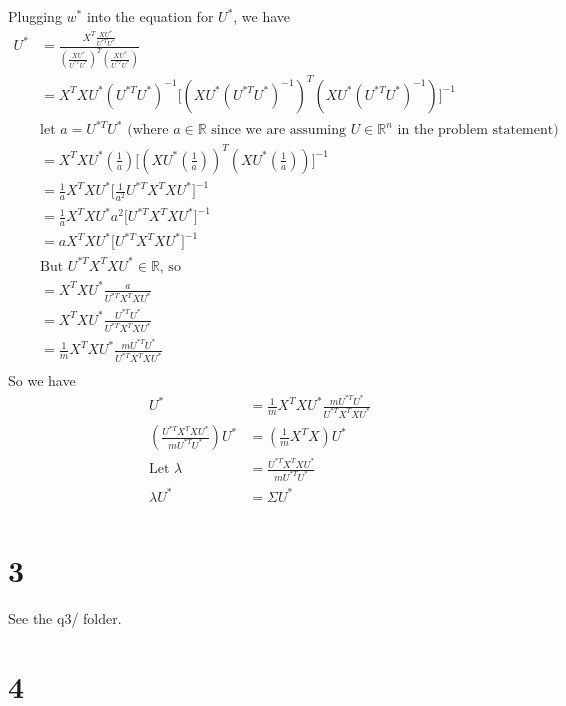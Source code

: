 \documentclass[11pt]{article}
\begin{document}
Plugging $w^*$ into the equation for $U^*$, we have
\begin{align*}
    U^* &= \frac{X^T \frac{XU^*}{U^{*T} U^*}}{(\frac{XU^*}{U^{*T}U^*})^T (\frac{XU^*}{U^{*T}U^*})} \\
        &= X^T X U^* (U^{*T} U^*)^{-1} \big[ (X U^* (U^{*T} U^*)^{-1})^T (X U^* (U^{*T} U^*)^{-1}) \big]^{-1} \\
        &\text{let $a = U^{*T} U^*$ (where $a \in \mathbb{R}$ since we are assuming $U \in \mathbb{R}^n$ in the problem statement)} \\
        &= X^T X U^* (\frac{1}{a}) \big[ (X U^* (\frac{1}{a}))^T (X U^* (\frac{1}{a})) \big]^{-1} \\
        &= \frac{1}{a} X^T X U^* \big[ \frac{1}{a^2} U^{*T} X^T X U^* \big]^{-1} \\
        &= \frac{1}{a} X^T X U^* a^2 \big[ U^{*T} X^T X U^* \big]^{-1} \\
        &= a X^T X U^* \big[ U^{*T} X^T X U^* \big]^{-1} \\
        &\text{But $U^{*T} X^T X U^* \in \mathbb{R}$, so} \\
        &= X^T X U^* \frac{a}{U^{*T} X^T X U^*} \\
        &= X^T X U^* \frac{U^{*T} U^*}{U^{*T} X^T X U^*} \\
        &= \frac{1}{m} X^T X U^* \frac{m U^{*T} U^*}{U^{*T} X^T X U^*} \\
\end{align*}
So we have
\begin{align*}
    U^* &= \frac{1}{m} X^T X U^* \frac{m U^{*T} U^*}{U^{*T} X^T X U^*} \\
    (\frac{U^{*T} X^T X U^*}{m U^{*T} U^*}) U^* &= (\frac{1}{m} X^T X) U^* \\
    \text{Let } \lambda &= \frac{U^{*T} X^T X U^*}{m U^{*T} U^*}\\
    \lambda U^* &= \Sigma U^* \\
\end{align*}

\section*{3}
See the q3/ folder.

\section*{4}
\end{document}
